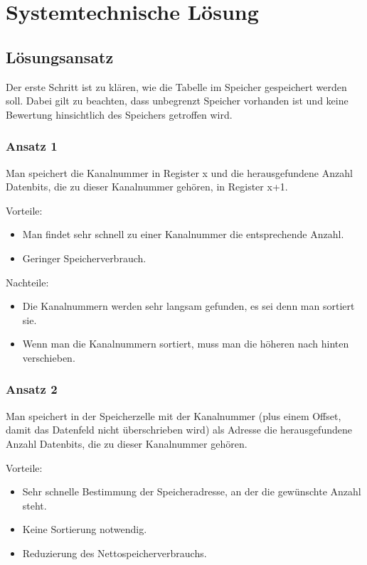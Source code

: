 \chapter{Systemtechnische Lösung}
\label{chapter:Pflichtenheft-SystemtechnischeLoesung}

\section{Lösungsansatz}
\label{section:Pflichtenheft-SystemtechnischeLoesung-Loesungsansatz}

Der erste Schritt ist zu klären, wie die Tabelle im Speicher gespeichert werden soll. Dabei gilt zu beachten, dass unbegrenzt Speicher vorhanden ist und keine Bewertung hinsichtlich des Speichers getroffen wird.

\subsection{Ansatz 1}
Man speichert die Kanalnummer in Register x und die herausgefundene Anzahl Datenbits, die zu dieser Kanalnummer gehören, in Register x+1.

Vorteile:
\begin{itemize}
    \item Man findet sehr schnell zu einer Kanalnummer die entsprechende Anzahl.
    \item Geringer Speicherverbrauch.
\end{itemize}

Nachteile:
\begin{itemize}
    \item Die Kanalnummern werden sehr langsam gefunden, es sei denn man sortiert sie.
    \item Wenn man die Kanalnummern sortiert, muss man die höheren nach hinten verschieben.
\end{itemize}

\subsection{Ansatz 2}
Man speichert in der Speicherzelle mit der Kanalnummer (plus einem Offset, damit das Datenfeld nicht überschrieben wird) als Adresse die herausgefundene Anzahl Datenbits, die zu dieser Kanalnummer gehören.

Vorteile:
\begin{itemize}
    \item Sehr schnelle Bestimmung der Speicheradresse, an der die gewünschte Anzahl steht.
    \item Keine Sortierung notwendig.
    \item Reduzierung des Nettospeicherverbrauchs.
\end{itemize}

